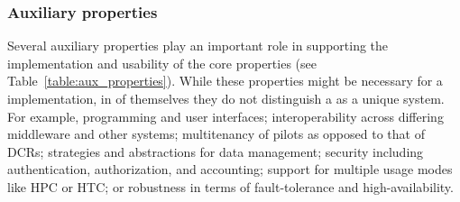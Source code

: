 \documentclass{sig-alternate}
\begin{document}
\begin{itemize}


\end{itemize}

\subsubsection{Auxiliary properties}
\label{sec:auxprops}

Several auxiliary properties play an important role in supporting the
implementation and usability of the core properties (see
Table~\ref{table:aux_properties}). While these properties might be necessary for
a \pilot implementation, in of themselves they do not distinguish a \pilot as a
unique system. For example, programming and user interfaces; interoperability
across differing middleware and other \pilot systems; multitenancy of pilots as
opposed to that of DCRs; strategies and abstractions for data management;
security including authentication, authorization, and accounting; support for
multiple usage modes like HPC or HTC; or robustness in terms of fault-tolerance
and high-availability.
\end{document}
